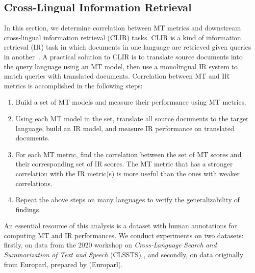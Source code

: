 \subsection{Cross-Lingual Information Retrieval}
\label{sec:clir}
In this section, we determine correlation between MT metrics and  downstream cross-lingual information retrieval (CLIR) tasks.
CLIR is a kind of information retrieval (IR) task in which documents in one language are retrieved given queries in another~\cite{grefenstette2012CLIR}. 
A practical solution to CLIR is to translate source documents into the query language using an MT model, then use a monolingual IR system to match queries with translated documents. 
Correlation between MT and IR metrics is accomplished in the following steps: 
\begin{enumerate}[noitemsep,topsep=0pt]
 \item Build a set of MT models and measure their performance using MT metrics.
 \item Using each MT model in the set, translate all source documents to the target language, build an IR model, and measure IR performance on translated documents.
 \item For each MT metric, find the correlation between the set of MT scores and their corresponding set of IR scores.
 The MT metric that has a stronger correlation with the IR metric(s) is more useful than the ones with weaker correlations.
\item Repeat the above steps on many languages to verify the generalizability of findings.
\end{enumerate}


An essential resource of this analysis is a dataset with human annotations for computing MT and IR performances.
We conduct experiments on two datasets: firstly, on data from the 2020 workshop on \textit{Cross-Language Search and Summarization of Text and Speech} (CLSSTS) \cite{zavorin-etal-2020-corpora}, and secondly, on data originally from Europarl, prepared by \citet{lignos-etal-2019-MT-IR} (Europarl).

